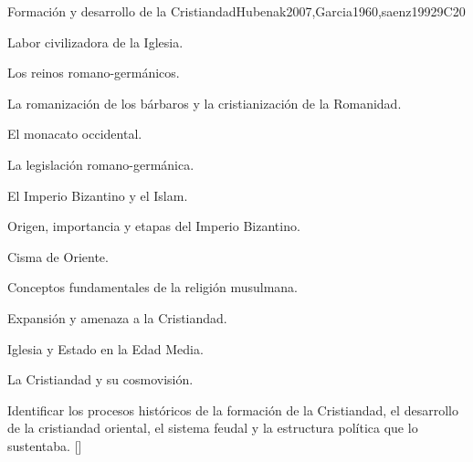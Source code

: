 \begin{syllabus}
\begin{unit}{}{Formación y desarrollo de la Cristiandad}{Hubenak2007,Garcia1960,saenz1992}{9}{C20}
\begin{topics}
	\item Labor civilizadora de la Iglesia.
	    \begin{subtopics}
		\item Los reinos romano-germánicos.
		\item La romanización de los bárbaros y la cristianización de la Romanidad.
		\item El monacato occidental.
		\item La legislación romano-germánica.
	    \end{subtopics}
	\item El Imperio Bizantino y el Islam.
	    \begin{subtopics}
		\item Origen, importancia y etapas del Imperio Bizantino.
		\item Cisma de Oriente.
		\item Conceptos fundamentales de la religión musulmana.
		\item Expansión y amenaza a la Cristiandad.
	    \end{subtopics}
	\item Iglesia y Estado en la Edad Media.
	\item La Cristiandad y su cosmovisión.
\end{topics}
\begin{learningoutcomes}
	\item Identificar los procesos históricos de la formación de la Cristiandad, el desarrollo de la cristiandad oriental, el sistema feudal y la estructura polí­tica que lo sustentaba. [\Familiarity]
\end{learningoutcomes}
\end{unit}


\end{syllabus}
